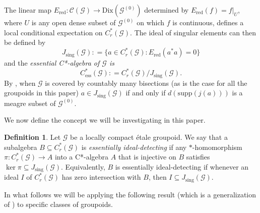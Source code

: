 \documentclass[12pt]{amsart}
\theoremstyle{definition}
\newtheorem{definition}[thm]{Definition}
\theoremstyle{remark}
\numberwithin{equation}{section}
\newcommand{\go}{\g^{(0)}}
\newcommand{\Ered}{E_{\text{red}}}
\newcommand{\g}{\mathcal{G}}
\newcommand{\C}{\mathcal{C}}
\newcommand{\Js}{J_{\text{sing}}}
\newcommand{\Cess}{C^*_{\text{ess}}}
\begin{document}
	 The linear map $\Ered: \C(\g)\to \text{Dix}(\go)$ determined by $\Ered(f) = \left. f\right|_U$, where $U$ is any open dense subset of $\go$ on which $f$ is continuous, defines a local conditional expectation on $C^*_r(\g)$. The ideal of singular elements can then be defined by 
	\[
	\Js(\g): = \{a\in C^*_r(\g): \Ered(a^*a) = 0\}
	\]
	and the {\em essential C*-algebra of $\g$ is}
	\[
	\Cess(\g) : = C^*_r(\g)/\Js(\g).
	\]
	By \cite[Proposition~7.18]{KM21}, when $\g$ is covered by countably many bisections (as is the case for all the groupoids in this paper) $a\in \Js(\g)$ if and only if $d(\text{supp}(j(a)))$ is a meagre subset of $\go$. 
	
	We now define the concept we will be investigating in this paper. 
	\begin{definition}\label{def:ess_ideal_detecting}
		Let $\g$ be a locally compact \'etale groupoid. We say that a subalgebra $B\subseteq C^*_r(\g)$ is {\em essentially ideal-detecting} if any $*$-homomorphism $\pi:C^*_r(\g)\to A$ into a C*-algebra $A$ that is injective on $B$ satisfies $\ker\pi\subseteq \Js(\g)$. Equivalently, $B$ is essentially ideal-detecting if whenever an ideal $I$ of $C^*_r(\g)$ has zero intersection with $B$, then $I\subseteq\Js(\g)$. 
	\end{definition}
	
		In what follows we will be applying the following result (which is a generalization of \cite[Theorem~4.7]{CN24}) to specific classes of groupoids.
	
\end{document}
